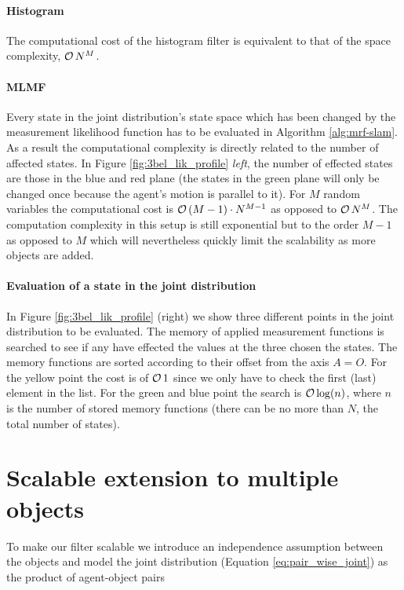 \paragraph{Histogram}
The computational cost of the histogram filter is equivalent to that of the space complexity, $\operatorname{\mathcal{O}}{ N^M }$.

\paragraph{MLMF}

Every state in the joint distribution's state space which has been changed by the measurement likelihood function has to be
evaluated in Algorithm \ref{alg:mrf-slam}. As a result the computational complexity is directly related to the number 
of affected states. In Figure \ref{fig:3bel_lik_profile} \textit{left}, the number of effected states are those in the blue
and red plane (the states in the green plane will only be changed once because the agent's motion is parallel to it).
For $M$ random variables the computational cost is $\operatorname{\mathcal{O}}{(M-1) \cdot N^{M-1}}$ as opposed to $\operatorname{\mathcal{O}}{ N^M }$. The computation complexity
in this setup is still exponential but to the order $M-1$ as opposed to $M$ which will nevertheless quickly limit the scalability as more objects are added. 

\paragraph{Evaluation of a state in the joint distribution}

In Figure \ref{fig:3bel_lik_profile} (right) we show three different points in the joint distribution to be evaluated. The memory of applied measurement functions 
is searched to see if any have effected the values at the three chosen the states. The memory functions are sorted according to their offset from the axis $A=O$. For the yellow point the
cost is of $\operatorname{\mathcal{O}}{1}$ since we only have to check the first (last) element in the list. For the green and blue point
the search is $\operatorname{\mathcal{O}}{\log(n)}$, where $n$ is the number of stored memory functions (there can be no more than $N$, the total number of states). 


\section{Scalable extension to multiple objects}\label{subsec:scalabe_extension}

To make our filter scalable we introduce an independence assumption between the objects and model the joint distribution (Equation \ref{eq:pair_wise_joint}) as the product 
of agent-object pairs

